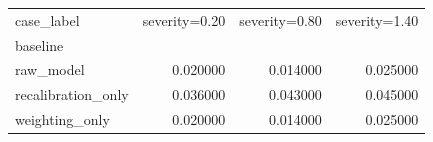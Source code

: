 \begin{tabular}{lrrr}
\toprule
case_label & severity=0.20 & severity=0.80 & severity=1.40 \\
baseline &  &  &  \\
\midrule
raw_model & 0.020000 & 0.014000 & 0.025000 \\
recalibration_only & 0.036000 & 0.043000 & 0.045000 \\
weighting_only & 0.020000 & 0.014000 & 0.025000 \\
\bottomrule
\end{tabular}
